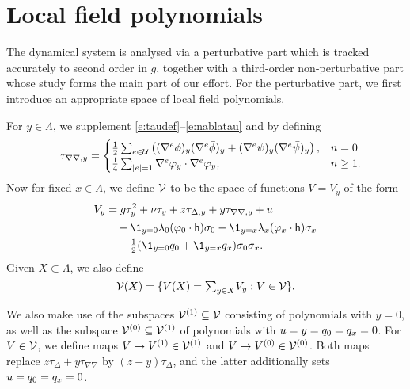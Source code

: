 
\section{Local field polynomials}

The dynamical system is analysed via a perturbative part which is tracked accurately
to second order in $g$, together with a third-order non-perturbative part whose study
forms the main part of our effort.  For the perturbative part, we first introduce
an appropriate space of local field polynomials.

For $y \in \Lambda$, we supplement \eqref{e:taudef}--\eqref{e:nablatau} and 
by defining
\begin{equation}
\label{e:tauphi2}
\quad \tau_{\nabla\nabla,y}
	=
\begin{cases}
\frac 12 \sum_{e \in \mathcal{U}}
\left(
	(\nabla^e \phi)_y (\nabla^e \bar\phi)_y +
	(\nabla^e \psi)_y (\nabla^e \bar\psi)_y
\right),
	& n = 0 \\
\frac{1}{4} \sum_{|e| = 1} \nabla^e \varphi_y \cdot \nabla^e \varphi_y,
	& n \ge 1.
\end{cases}
\end{equation}
Now for fixed $x \in \Lambda$,
we define $\mathcal{V}$ to be the space of functions $V=V_y$ of the form 
\begin{align}
\lbeq{Vy}
V_y
	&=
g \tau_y^2 + \nu \tau_y + z \tau_{\Delta,y} + y \tau_{\nabla\nabla,y} + u
	\nnb&\quad
- \1_{y=\pp}\lambda_{\pp}(\varphi_{\pp} \cdot {\sf h})\sigma_\pp
- \1_{y=\qq}\lambda_{\qq}(\varphi_{\qq} \cdot {\sf h})\sigma_\qq
	\nnb&\quad
- \textstyle{\frac 12} (\1_{y=\pp} q_\pp + \1_{y=\qq}q_\qq )\sigma_\pp\sigma_\qq.
\end{align}
Given $X \subset \Lambda$, we also define
\begin{equation}
\label{e:Vcalesig}
\mathcal{V}(X) = \{V(X) = \textstyle{\sum_{y\in X}} V_y : V \in \mathcal{V} \}.
\end{equation}

We also make use of the subspaces $\mathcal{V}^{(1)} \subseteq \mathcal{V}$ consisting of polynomials with $y = 0$, as well as the subspace
$\mathcal{V}^{(0)} \subseteq \mathcal{V}^{(1)}$ of polynomials with
$u = y =   q_0=q_x = 0$.
For $V \in \mathcal{V}$, we define maps $V \mapsto V^{(1)} \in \mathcal{V}^{(1)}$
and $V \mapsto V^{(0)} \in \mathcal{V}^{(0)}$. Both maps replace
$z\tau_{\Delta}+y\tau_{\nabla\nabla}$ by
$(z+y)\tau_{\Delta}$, and the latter
additionally sets
$u = q_0 = q_x = 0$.

